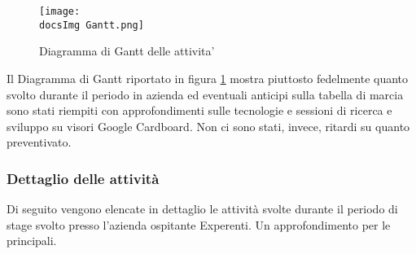 \begin{figure}[H]
	\centering
	\texttt{[image: \\docsImg Gantt.png]}
	\caption{Diagramma di Gantt delle attivita'}
	\label{fig:Diagramma di Gantt delle attivita}
\end{figure}

Il Diagramma di Gantt riportato in figura \ref{fig:Diagramma di Gantt delle attivita} mostra piuttosto fedelmente quanto svolto durante il periodo in azienda ed eventuali anticipi sulla tabella di marcia sono stati riempiti con approfondimenti sulle tecnologie e sessioni di ricerca e sviluppo su visori Google Cardboard. Non ci sono stati, invece, ritardi su quanto preventivato.

\subsubsection{Dettaglio delle attivit\`a}
Di seguito vengono elencate in dettaglio le attivit\`a svolte durante il periodo di stage svolto presso l'azienda ospitante Experenti. Un approfondimento per le principali. 

